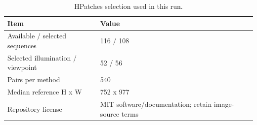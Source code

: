 \begin{table}[htbp]
\centering
\small
\caption{HPatches selection used in this run.}
\label{tab:data_stats}
\begin{tabular}{@{}ll@{}}
\toprule
Item & Value \\
\midrule
Available / selected sequences & 116 / 108 \\
Selected illumination / viewpoint & 52 / 56 \\
Pairs per method & 540 \\
Median reference H x W & 752 x 977 \\
Repository license & MIT software/documentation; retain image-source terms \\
\bottomrule
\end{tabular}
\end{table}
